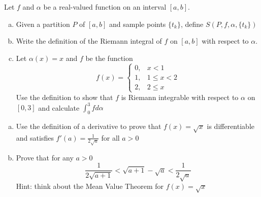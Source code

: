 \documentclass[11pt]{exam}
\theoremstyle{definition}
\begin{document}
\begin{questions}
\newpage
\question[10]\mbox{}
Let $f$ and $\alpha$ be a real-valued function on an interval $[a,b]$.
\begin{enumerate}[(a)]
\item  Given a partition $P$ of $[a,b]$ and sample points $\{t_k\}$, define $S(P,f,\alpha,\{t_k\})$
\vspace{1in}
\item  Write the definition of the Riemann integral of $f$ on $[a,b]$ with respect to $\alpha$.
\vspace{2in}
\item  Let $\alpha(x)=x$ and $f$ be the function
$$f(x) = \left\lbrace\begin{array}{cc}
0, & x < 1\\
1, & 1 \leq x < 2\\
2, & 2\leq x
\end{array}\right.$$
Use the definition to show that $f$ is Riemann integrable with respect to $\alpha$ on $[0,3]$ and calculate $\int_0^3fd\alpha$
\end{enumerate}

\newpage
\question[10]\mbox{}
\begin{enumerate}[(a)]
\item Use the definition of a derivative to prove that $f(x) = \sqrt{x}$ is differentiable and satisfies $f'(a) = \frac{1}{2\sqrt{a}}$ for all $a > 0$
\vspace{3in}
\item Prove that for any $a>0$
$$\frac{1}{2\sqrt{a+1}} < \sqrt{a+1}-\sqrt{a} < \frac{1}{2\sqrt{a}}$$
Hint: think about the Mean Value Theorem for $f(x) = \sqrt{x}$
\end{enumerate}


\end{questions}
\end{document}
